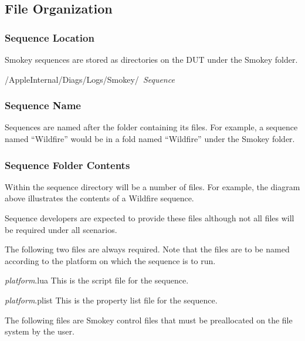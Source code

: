 \documentclass[11pt]{article}
\makeatletter
\newcommand{\iftt}[1]{\ifthenelse{\equal{\f@family}{\ttdefault}}{#1}{}}
\newcommand{\param}[1]{{\iftt{\bfseries}{}\itshape#1}}
\makeatother
\begin{document}
\subsection{File Organization}

\subsubsection{Sequence Location}

Smokey sequences are stored as directories on the DUT under the Smokey folder. 

\begin{Setting}
/AppleInternal/Diags/Logs/Smokey/~\param{Sequence}~
\end{Setting}

\subsubsection{Sequence Name}

Sequences are named after the folder containing its files.  For example, a
sequence named ``Wildfire'' would be in a fold named ``Wildfire'' under the Smokey
folder.


\subsubsection{Sequence Folder Contents}

Within the sequence directory will be a number of files.  For example, the
diagram above illustrates the contents of a Wildfire sequence.

Sequence developers are expected to provide these files although not all files
will be required under all scenarios.

The following two files are always required.  Note that the files are to be
named according to the platform on which the sequence is to run.

\begin{Definition}

\item[\param{platform}.lua] This is the script file for the sequence.

\item[\param{platform}.plist] This is the property list file for the sequence.

\end{Definition}

The following files are Smokey control files that must be preallocated on the
file system by the user.
\end{document}
